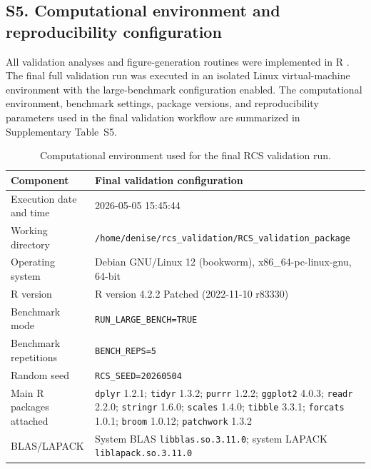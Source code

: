 \documentclass[preprint,12pt]{elsarticle}
\begin{document}
\subsection*{S5. Computational environment and reproducibility configuration}

All validation analyses and figure-generation routines were implemented in \textsf{R} \cite{RCoreTeam2024}. The final full validation run was executed in an isolated Linux virtual-machine environment with the large-benchmark configuration enabled. The computational environment, benchmark settings, package versions, and reproducibility parameters used in the final validation workflow are summarized in Supplementary Table~S5.

\setcounter{table}{4}
\begin{table}[!htbp]
\caption{Computational environment used for the final RCS validation run.}
\label{tab:computational_environment}
\centering

\footnotesize
\setlength{\tabcolsep}{3pt}
\renewcommand{\arraystretch}{1.08}

\begin{tabular}{@{}L{4.4cm}L{11.0cm}@{}}

\toprule
\textbf{Component}
& \textbf{Final validation configuration} \\
\midrule

Execution date and time
& 2026-05-05 15:45:44 \\

Working directory
& \texttt{/home/denise/rcs\_validation/RCS\_validation\_package} \\

Operating system
& Debian GNU/Linux 12 (bookworm), x86\_64-pc-linux-gnu, 64-bit \\

R version
& R version 4.2.2 Patched (2022-11-10 r83330) \\

Benchmark mode
& \texttt{RUN\_LARGE\_BENCH=TRUE} \\

Benchmark repetitions
& \texttt{BENCH\_REPS=5} \\

Random seed
& \texttt{RCS\_SEED=20260504} \\

Main R packages attached
& \texttt{dplyr} 1.2.1;
\texttt{tidyr} 1.3.2;
\texttt{purrr} 1.2.2;
\texttt{ggplot2} 4.0.3;
\texttt{readr} 2.2.0;
\texttt{stringr} 1.6.0;
\texttt{scales} 1.4.0;
\texttt{tibble} 3.3.1;
\texttt{forcats} 1.0.1;
\texttt{broom} 1.0.12;
\texttt{patchwork} 1.3.2 \\

BLAS/LAPACK
& System BLAS \texttt{libblas.so.3.11.0}; system LAPACK \texttt{liblapack.so.3.11.0} \\

\bottomrule

\end{tabular}

\end{table}

\FloatBarrier



\end{document}
